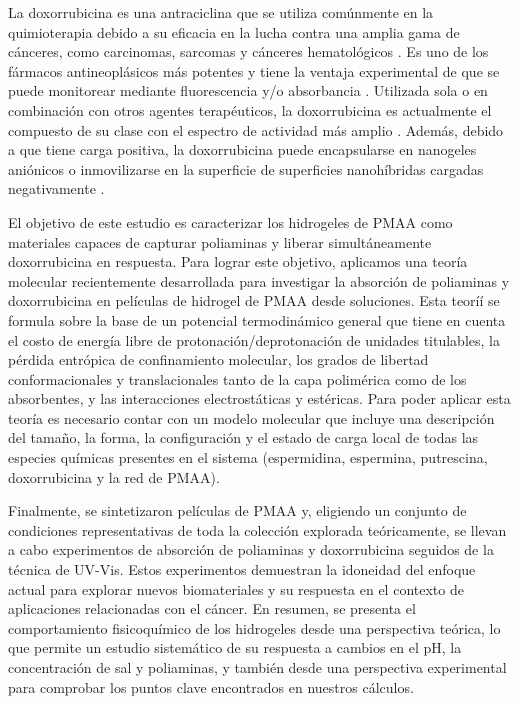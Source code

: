 La doxorrubicina es una antraciclina que se utiliza com\'unmente en la quimioterapia debido a su eficacia en la lucha contra una amplia gama de c\'anceres, como carcinomas, sarcomas y c\'anceres hematol\'ogicos \cite{Panis2012}.
Es uno de los f\'armacos antineopl\'asicos más potentes y tiene la ventaja experimental de que se puede monitorear mediante fluorescencia y/o absorbancia  \cite{serpe2005doxorubicin}.
Utilizada sola o en combinaci\'on con otros agentes terap\'euticos, la doxorrubicina es actualmente el compuesto de su clase con el espectro de actividad m\'as amplio  \cite{carvalho2009}.
Adem\'as, debido a que tiene carga positiva, la doxorrubicina puede encapsularse en nanogeles ani\'onicos \cite{li2019} o inmovilizarse en la superficie de superficies nanoh\'ibridas cargadas negativamente \cite{kazempour2019}.

El objetivo de este estudio es caracterizar los hidrogeles de PMAA como materiales capaces de capturar poliaminas y liberar simult\'aneamente doxorrubicina en respuesta.
Para lograr este objetivo, aplicamos una teor\'ia molecular recientemente desarrollada para investigar la absorci\'on de poliaminas y doxorrubicina en pel\'iculas de hidrogel de PMAA desde soluciones.
Esta teorí\'i se formula sobre la base de un potencial termodin\'amico general que tiene en cuenta el costo de energ\'ia libre de protonaci\'on/deprotonaci\'on de unidades titulables, la p\'erdida entr\'opica de confinamiento molecular, los grados de libertad conformacionales y translacionales tanto de la capa polim\'erica como de los absorbentes, y las interacciones electrost\'aticas y est\'ericas.
Para poder aplicar esta teor\'ia es necesario contar con un modelo molecular que incluye una descripci\'on del tama\~no, la forma, la configuraci\'on y el estado de carga local de todas las especies qu\'imicas presentes en el sistema (espermidina, espermina, putrescina, doxorrubicina y la red de PMAA).

Finalmente, se sintetizaron pel\'iculas de PMAA y, eligiendo un conjunto de condiciones representativas de toda la colecci\'on explorada te\'oricamente, se llevan  a cabo experimentos de absorci\'on de poliaminas y doxorrubicina seguidos de la t\'ecnica de UV-Vis.
Estos experimentos demuestran la idoneidad del enfoque actual para explorar nuevos biomateriales y su respuesta en el contexto de aplicaciones relacionadas con el c\'ancer.
En resumen, se presenta el comportamiento fisicoqu\'imico de los hidrogeles desde una perspectiva te\'orica, lo que permite un estudio sistem\'atico de su respuesta a cambios en el pH, la concentraci\'on de sal y poliaminas, y tambi\'en desde una perspectiva experimental para comprobar los puntos clave encontrados en nuestros c\'alculos.


